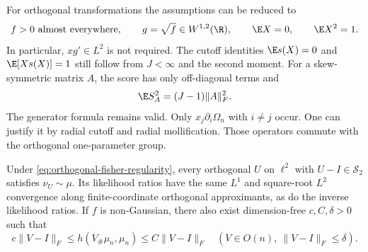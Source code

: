 For orthogonal transformations the assumptions can be reduced to
\begin{equation}
 f>0\ \text{almost everywhere},\qquad
 g=\sqrt f\in W^{1,2}(\R),\qquad
 \E X=0,\qquad\E X^2=1.
 \label{eq:orthogonal-fisher-regularity}
\end{equation}
In particular, $xg'\in L^2$ is not required.
The cutoff identities $\E s(X)=0$ and $\E[Xs(X)]=1$ still follow
from $J<\infty$ and the second moment.
For a skew-symmetric matrix $A$, the score has only off-diagonal terms and
\begin{equation}
 \E S_A^2=(J-1)\|A\|_F^2.
 \label{eq:orthogonal-fisher}
\end{equation}
The generator formula remains valid.
Only $x_j\partial_i\Omega_n$ with $i\ne j$ occur.
One can justify it by radial cutoff and radial mollification.
Those operators commute with the orthogonal one-parameter group.

\begin{proposition}
\label{prop:orthogonal-sufficiency}
Under \eqref{eq:orthogonal-fisher-regularity}, every
orthogonal $U$ on $\ell^2$ with $U-I\in\mathcal S_2$ satisfies
$\nu_U\sim\mu$.  Its likelihood ratios have the same $L^1$ and
square-root $L^2$ convergence along finite-coordinate orthogonal
approximants, as do the inverse likelihood ratios.
If $f$ is non-Gaussian, there also exist dimension-free
$c,C,\delta>0$ such that
\begin{equation}
 c\|V-I\|_F\le h(V_\#\mu_n,\mu_n)
                   \le C\|V-I\|_F
 \quad(V\in O(n),\ \|V-I\|_F\le\delta).
 \label{eq:orthogonal-local-hellinger}
\end{equation}
\end{proposition}

